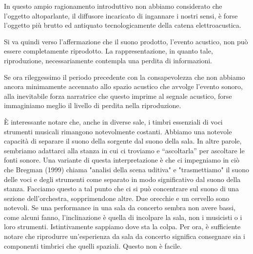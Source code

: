 

In questo ampio ragionamento introduttivo non abbiamo considerato che l'oggetto
altoparlante, il diffusore incaricato di ingannare i nostri sensi, è forse
l'oggetto più brutto ed antiquato tecnologicamente della catena elettroacustica.


Si va quindi verso l'affermazione che il suono prodotto, l'evento acustico, non
può essere completamente riprodotto. La rappresentazione, in quanto tale,
riproduzione, necessariamente contempla una perdita di informazioni.

Se ora rileggessimo il periodo precedente con la consapevolezza che non abbiamo
ancora minimamente accennato allo spazio acustico che avvolge l'evento sonoro,
alla inevitabile forza narratrice che questo imprime al segnale acustico, forse
immaginiamo meglio il livello di perdita nella riproduzione.

È interessante notare che, anche in diverse sale, i timbri essenziali di voci
strumenti musicali rimangono notevolmente costanti. Abbiamo una notevole
capacità di separare il suono della sorgente dal suono della sala. In altre
parole, sembriamo adattarci alla stanza in cui ci troviamo e “ascoltarla” per
ascoltare le fonti sonore. Una variante di questa interpretazione è che ci
impegniamo in ciò che Bregman (1999) chiama "analisi della scena uditiva" e
"trasmettiamo" il suono delle voci e degli strumenti come separato in modo
significativo dal suono della stanza. Facciamo questo a tal punto che ci si può
concentrare sul suono di una sezione dell'orchestra, sopprimendone altre. Due
orecchie e un cervello sono notevoli. Se una performance in una sala da concerto
sembra non avere bassi, come alcuni fanno, l'inclinazione è quella di incolpare
la sala, non i musicisti o i loro strumenti. Istintivamente sappiamo dove sta
la colpa. Per ora, è sufficiente notare che riprodurre un'esperienza da sala da
concerto significa consegnare sia i componenti timbrici che quelli spaziali.
Questo non è facile.

